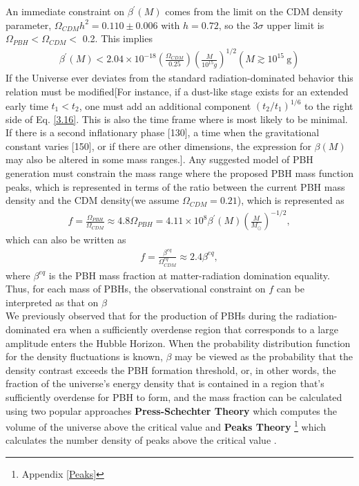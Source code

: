 An immediate constraint on $\beta^{\prime}(M)$ comes from the limit on the CDM density parameter, $\Omega_{C D M} h^2=0.110 \pm 0.006$ with $h=0.72$, so the $3 \sigma$ upper limit is $\Omega_{PBH}<\Omega_{CDM}<$ 0.2. This implies
\begin{align}
    \beta^{\prime}(M)<2.04 \times 10^{-18}\left(\frac{\Omega_{CDM}}{0.25}\right)\left(\frac{M}{10^{15} g}\right)^{1 / 2}\left(M \gtrsim 10^{15} \mathrm{~g}\right)\label{3.16}
\end{align}
If the Universe ever deviates from the standard radiation-dominated behavior this relation must be modified[For instance, if a dust-like stage exists for an extended early time $t_1 < t_2$, one must add an additional component $(t_2/t_1)^{1/6}$ to the right side of Eq. \ref{3.16}. This is also the time frame where is most likely to be minimal. If there is a second inflationary phase [130], a time when the gravitational constant varies [150], or if there are other dimensions, the expression for $\beta(M)$ may also be altered in some mass ranges.]. Any suggested model of PBH generation must constrain the mass range where the proposed PBH mass function peaks, which is represented in terms of the ratio between the current PBH mass density and the CDM density(we assume $\Omega_{CDM} = 0.21$), which is represented as
\begin{align}
    f=\frac{\Omega_{PBH}}{\Omega_{CDM}} \approx 4.8 \Omega_{PBH}=4.11 \times 10^8 \beta^{\prime}(M)\left(\frac{M}{M_{\odot}}\right)^{-1 / 2},\label{3.17}
\end{align}
which can also be written as 
\begin{align}
    f = \frac{\beta^{eq}}{\Omega_{CDM}^{eq}} \approx 2.4 \beta^{eq}, \label{3.18}
\end{align}
where $\beta^{eq}$ is the PBH mass fraction at matter-radiation domination equality.
Thus, for each mass of PBHs, the observational constraint on $f$ can be interpreted as that on $\beta$\\
\hspace{0.5cm} We previously observed that for the production of PBHs during the radiation-dominated era when a sufficiently overdense region that corresponds to a large amplitude enters the Hubble Horizon. When the probability distribution function for the density fluctuations is known, $\beta$ may be viewed as the probability that the density contrast exceeds the PBH formation threshold, or, in other words, the fraction of the universe's energy density that is contained in a region that's sufficiently overdense for PBH to form, and the mass fraction can be calculated using two popular approaches \textbf{Press-Schechter Theory} which computes the volume of the universe above the critical value\cite{1974ApJ...187..425P} and \textbf{Peaks Theory} \footnote{Appendix \ref{Peaks}} which calculates the number density of peaks above the critical value \cite{1986ApJ...304...15B}. \\

